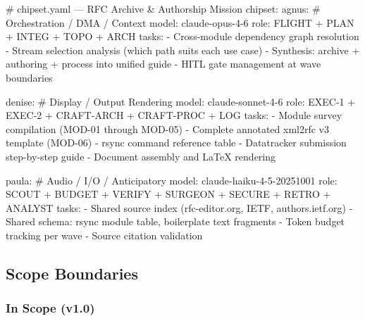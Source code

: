 \documentclass[11pt,letterpaper]{article}
\begin{document}
\begin{asciibox}
# chipset.yaml — RFC Archive & Authorship Mission
chipset:
  agnus:   # Orchestration / DMA / Context
    model:  claude-opus-4-6
    role:   FLIGHT + PLAN + INTEG + TOPO + ARCH
    tasks:
      - Cross-module dependency graph resolution
      - Stream selection analysis (which path suits each use case)
      - Synthesis: archive + authoring + process into unified guide
      - HITL gate management at wave boundaries

  denise:  # Display / Output Rendering
    model:  claude-sonnet-4-6
    role:   EXEC-1 + EXEC-2 + CRAFT-ARCH + CRAFT-PROC + LOG
    tasks:
      - Module survey compilation (MOD-01 through MOD-05)
      - Complete annotated xml2rfc v3 template (MOD-06)
      - rsync command reference table
      - Datatracker submission step-by-step guide
      - Document assembly and LaTeX rendering

  paula:   # Audio / I/O / Anticipatory
    model:  claude-haiku-4-5-20251001
    role:   SCOUT + BUDGET + VERIFY + SURGEON + SECURE + RETRO + ANALYST
    tasks:
      - Shared source index (rfc-editor.org, IETF, authors.ietf.org)
      - Shared schema: rsync module table, boilerplate text fragments
      - Token budget tracking per wave
      - Source citation validation
\end{asciibox}

\subsection{Scope Boundaries}

\subsubsection{In Scope (v1.0)}
\end{document}
